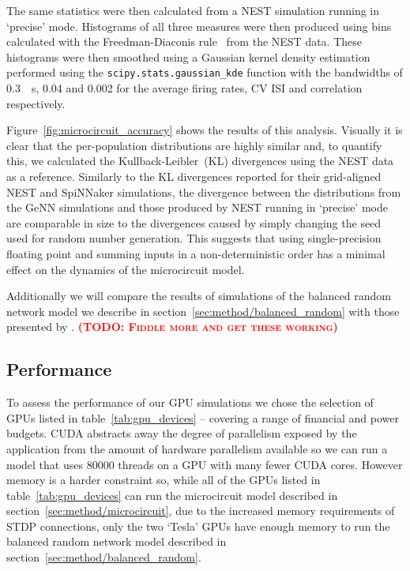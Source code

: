 \documentclass[utf8]{frontiersSCNS} %
\newcommand{\todo}[1]{\textbf{\textsc{\textcolor{red}{(TODO: #1)}}}}
\begin{document}
The same statistics were then calculated from a NEST simulation running in `precise' mode.
Histograms of all three measures were then produced using bins calculated with the Freedman-Diaconis rule~\citep{Freedman1981} from the NEST data.
These histograms were then smoothed using a Gaussian kernel density estimation performed using the \lstinline{scipy.stats.gaussian_kde} function with the bandwidths of \SI{0.3}{\per\second}, \num{0.04} and \num{0.002} for the average firing rates, CV ISI and correlation respectively.

Figure~\ref{fig:microcircuit_accuracy} shows the results of this analysis.
Visually it is clear that the per-population distributions are highly similar and, to quantify this, we calculated the Kullback-Leibler~(KL) divergences using the NEST data as a reference.
Similarly to the KL divergences \citet{VanAlbada2018} reported for their grid-aligned NEST and SpiNNaker simulations, the divergence between the distributions from the GeNN simulations and those produced by NEST running in `precise' mode are comparable in size to the divergences caused by simply changing the seed used for random number generation.
This suggests that using single-precision floating point and summing inputs in a non-deterministic order has a minimal effect on the dynamics of the microcircuit model.

Additionally we will compare the results of simulations of the balanced random network model we describe in section~\ref{sec:method/balanced_random} with those presented by \citet{Morrison2007}.
\todo{Fiddle more and get these working}

\subsection{Performance}
\label{sec:results/performance}
To assess the performance of our GPU simulations we chose the selection of GPUs listed in table~\ref{tab:gpu_devices} -- covering a range of financial and power budgets.
CUDA abstracts away the degree of parallelism exposed by the application from the amount of hardware parallelism available so we can run a model that uses \num{80000} threads on a GPU with many fewer CUDA cores.
However memory is a harder constraint so, while all of the GPUs listed in table~\ref{tab:gpu_devices} can run the microcircuit model described in section~\ref{sec:method/microcircuit}, due to the increased memory requirements of STDP connections, only the two `Tesla' GPUs have enough memory to run the balanced random network model described in section~\ref{sec:method/balanced_random}.
\end{document}
